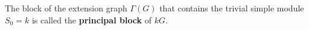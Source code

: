 The block of the extension graph $\Gamma(G)$ that contains the trivial simple module $S_0 = k$ is called the \textbf{principal block} of $kG$.
